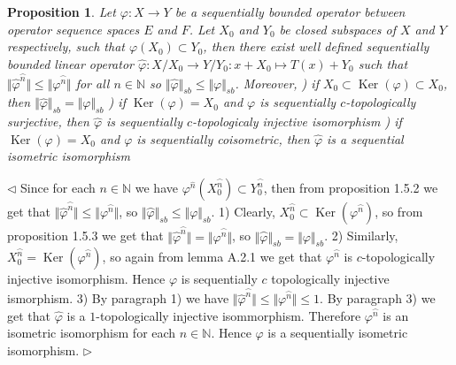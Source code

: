 \documentclass[12pt]{article}
\newtheorem{proposition}[theorem]{Proposition}
\newenvironment{proof}{\par $\triangleleft$}{$\triangleright$}
\begin{document}
\begin{proposition}\label{PrFactorSQOp} 
Let $\varphi:X\to Y$ be a sequentially bounded operator between operator sequence spaces $E$ and $F$. Let $X_0$ and $Y_0$ be closed subspaces of $X$ and $Y$ respectively, such that $\varphi(X_0)\subset Y_0$, then there exist well defined sequentially bounded linear operator $\widehat{\varphi}:X/X_0\to Y/Y_0:x+X_0\mapsto T(x)+Y_0$ such that $\Vert\widehat{\varphi}^{\wideparen{n}}\Vert\leq\Vert \varphi^{\wideparen{n}}\Vert$ for all $n\in\mathbb{N}$ so $\Vert\widehat{\varphi}\Vert_{sb}\leq\Vert \varphi\Vert_{sb}$. Moreover,
) if $X_0\subset \operatorname{Ker}(\varphi)\subset X_0$, then  $\Vert\widehat{\varphi}\Vert_{sb}=\Vert \varphi\Vert_{sb}$
) if $\operatorname{Ker}(\varphi)= X_0$ and $\varphi$ is sequentially $c$-topologically surjective, then $\widehat{\varphi}$ is sequentially $c$-topologicaly injective isomorphism
) if $\operatorname{Ker}(\varphi)= X_0$ and $\varphi$ is sequentially coisometric, then $\widehat{\varphi}$ is a sequential isometric isomorphism
\end{proposition}
\begin{proof}
Since for each $n\in\mathbb{N}$ we have $\varphi^{\widehat{n}}(X_0^{\wideparen{n}})\subset Y_0^{\wideparen{n}}$, then from proposition 1.5.2 \cite{HelFA} we get that $\Vert\widehat{\varphi}^{\wideparen{n}}\Vert\leq\Vert \varphi^{\wideparen{n}}\Vert$, so $\Vert\wideparen{\varphi}\Vert_{sb}\leq\Vert\varphi\Vert_{sb}$. 1) Clearly, $X_0^{\wideparen{n}}\subset\operatorname{Ker}(\varphi^{\wideparen{n}})$, so from proposition 1.5.3 \cite{HelFA} we get that $\Vert\widehat{\varphi}^{\wideparen{n}}\Vert=\Vert \varphi^{\wideparen{n}}\Vert$, so $\Vert\wideparen{\varphi}\Vert_{sb}=\Vert\varphi\Vert_{sb}$. 2) Similarly, $X_0^{\wideparen{n}}=\operatorname{Ker}(\varphi^{\wideparen{n}})$, so again from lemma A.2.1 \cite{EROpSp} we get that $\varphi^{\wideparen{n}}$ is $c$-topologically injective isomorphism. Hence $\varphi$ is sequentially $c$ topologically injective ismorphism. 3) By paragraph 1) we have $\Vert\widehat{\varphi}^{\wideparen{n}}\Vert\leq\Vert \varphi^{\wideparen{n}}\Vert\leq 1$. By paragraph 3) we get that $\widehat{\varphi}$ is a $1$-topologically injective isommorphism. Therefore $\varphi^{\wideparen{n}}$ is an isometric isomorphism for each $n\in\mathbb{N}$. Hence $\varphi$ is a sequentially isometric isomorphism.
\end{proof}
\end{document}
